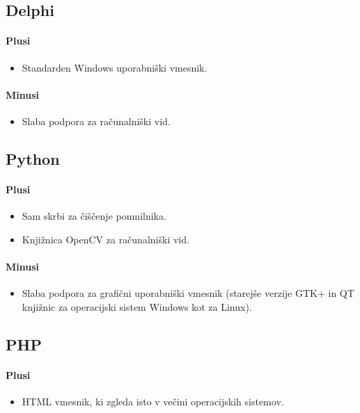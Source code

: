 \documentclass[oneside, a4paper, 12pt]{book}
\begin{document}
\subsection{Delphi}
\paragraph{Plusi}
\begin{itemize}
\item Standarden Windows uporabniški vmesnik.
\end{itemize}
\paragraph{Minusi}
\begin{itemize}
\item Slaba podpora za računalniški vid.
\end{itemize}

\subsection{Python}
\paragraph{Plusi}
\begin{itemize}
\item Sam skrbi za čiščenje pomnilnika.
\item Knjižnica OpenCV za računalniški vid.
\end{itemize}
\paragraph{Minusi}
\begin{itemize}
\item Slaba podpora za grafični uporabniški vmesnik (starejše verzije GTK+ in QT knjižnic za operacijski sistem Windows kot za Linux).
\end{itemize}

\subsection{PHP}
\paragraph{Plusi}
\begin{itemize}
\item HTML vmesnik, ki zgleda isto v večini operacijskih sistemov.
\end{itemize}
\end{document}

